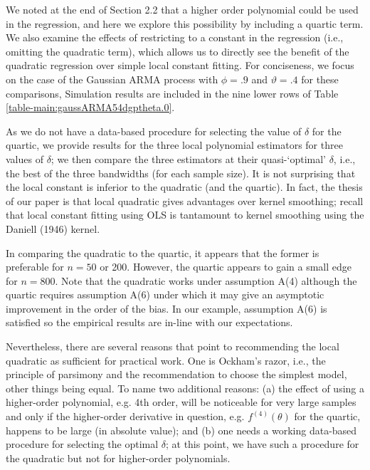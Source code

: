 \documentclass[12p E.Lt,psfig]{article} %
\begin{document}
    
 We noted at the end of Section 2.2 that a higher order polynomial could be used in the regression,
  and here we explore this possibility by including a quartic term.  We also examine the effects of 
  restricting to a constant in the regression (i.e., omitting the quadratic term), which allows us to directly
  see the benefit of the quadratic regression over simple local constant fitting. 
For conciseness,  we focus   on the case of the Gaussian ARMA process with $\phi = .9$ and $\vartheta = .4$
  for these comparisons, Simulation results are included in the nine lower rows of Table \ref{table-main:gaussARMA54dgptheta.0}.
 
As we do not have a data-based procedure for selecting the value of $\delta$ for the
quartic, we provide results for the three local polynomial estimators for
three  values of $\delta$; we   then compare the three estimators at their 
quasi-`optimal' $\delta$, i.e.,  the best  of the three bandwidths (for each sample
size). 
It is not surprising that the local constant is inferior to   the quadratic (and the
quartic). In fact, the thesis of our paper is that local quadratic gives
advantages over kernel smoothing; 
recall that local constant fitting  using OLS   is   
 tantamount to kernel smoothing using the Daniell (1946)  kernel. 

In comparing the   quadratic to the
quartic, it appears that the former is preferable for $n=50$ or 200.
However, the quartic appears to gain a small edge for $n=800.$
Note that the quadratic works under assumption A(4) although  the quartic
requires assumption A(6) under which it  may give an
asymptotic improvement in the order of the bias. 
In our example, assumption A(6) is satisfied so the
empirical results are  in-line with our expectations. 

Nevertheless, there are several reasons that point to 
recommending the  local quadratic as sufficient for practical work. 
One is Ockham's razor, i.e., the principle of parsimony and the
recommendation to choose the simplest model, other things being equal. 
To name two additional reasons:
(a) the effect of using a higher-order polynomial, e.g. 4th order,
will be noticeable for very large samples and only 
 if  the  higher-order derivative
in question, e.g. $f^{(4)}(\theta)$ for the quartic, happens  to be large
(in absolute value); and 
(b) one needs a working data-based procedure for selecting the
optimal  $\delta$; at this point, we have such a procedure for the 
quadratic but not for higher-order polynomials.
\end{document}
